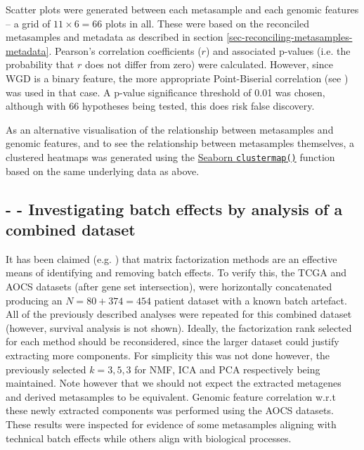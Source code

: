 \documentclass[tikz, 11pt,a4paper,oneside,fleqn, draft]{article}
\begin{document}
Scatter plots were generated between each metasample and each genomic features -- a grid of $11 \times 6 = 66$ plots in all.  These were based on the reconciled metasamples and metadata as described in section \ref{sec-reconciling-metasamples-metadata}.  Pearson's correlation coefficients ($r$) and associated p-values (i.e. the probability that $r$ does not differ from zero) were calculated.   However, since WGD is a binary feature, the more appropriate Point-Biserial correlation (see \cite{Wikipediab}) was used in that case.  A p-value significance threshold of 0.01 was chosen, although with 66 hypotheses being tested, this does risk false discovery.

As an alternative visualisation of the relationship between metasamples and genomic features, and to see the relationship between metasamples themselves, a clustered heatmaps was generated using the \href{https://seaborn.pydata.org/generated/seaborn.clustermap.html}{Seaborn {\tt clustermap()}} function based on the same underlying data as above.  

\subsection{- - Investigating batch effects by analysis of a combined dataset}

It has been claimed (e.g. \cite{Stein-OBrien2018,Renard2016}) that matrix factorization methods are an effective means of identifying and removing batch effects.  To verify this, the TCGA and AOCS datasets (after gene set intersection), were horizontally concatenated producing an $N=80+374=454$ patient dataset with a known batch artefact.  All of the previously described analyses were repeated for this combined dataset (however, survival analysis is not shown).  Ideally, the factorization rank selected for each method should be reconsidered, since the larger dataset could justify extracting more components.  For simplicity this was not done however, the previously selected $k = 3,5,3$ for NMF, ICA and PCA respectively being maintained.   Note however that we should not expect the extracted metagenes and derived metasamples to be equivalent. Genomic feature correlation w.r.t these newly extracted components was performed using the AOCS datasets.  These results were inspected for evidence of some metasamples aligning with technical batch effects while others align with biological processes.



\clearpage
\end{document}

